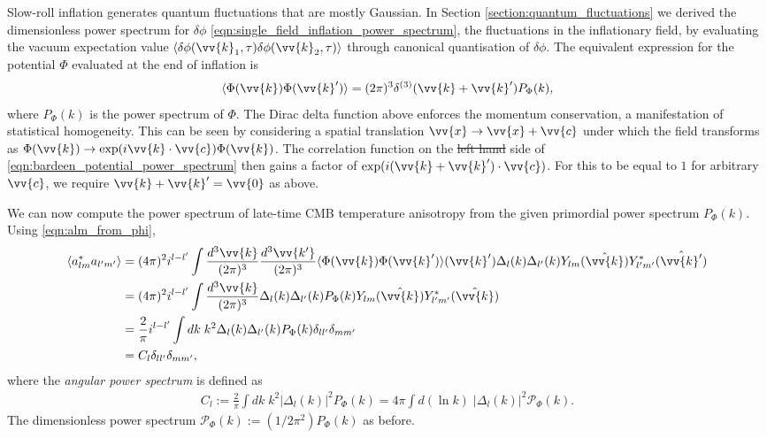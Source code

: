 \documentclass[a4paper,12pt,times,custombib,print,index]{Classes/PhDThesisPSnPDF} %
\providecommand{\DIFadd}[1]{{\protect\color{blue}\uwave{#1}}} %
\providecommand{\DIFdel}[1]{{\protect\color{red}\sout{#1}}}                      %
\providecommand{\DIFaddbegin}{} %
\providecommand{\DIFaddend}{} %
\providecommand{\DIFdelbegin}{} %
\providecommand{\DIFdelend}{} %
\newcommand{\DIFscaledelfig}{0.5}
\newlength{\DIFdelgraphicswidth} %
\newlength{\DIFdelgraphicsheight} %
\newcommand{\DIFaddincludegraphics}[2][]{{\color{blue}\fbox{\DIFOincludegraphics[#1]{#2}}}} %
\newcommand{\DIFdelincludegraphics}[2][]{%
\sbox{\DIFdelgraphicsbox}{\DIFOincludegraphics[#1]{#2}}%
\settoboxwidth{\DIFdelgraphicswidth}{\DIFdelgraphicsbox} %
\settoboxtotalheight{\DIFdelgraphicsheight}{\DIFdelgraphicsbox} %
\scalebox{\DIFscaledelfig}{%
\parbox[b]{\DIFdelgraphicswidth}{\usebox{\DIFdelgraphicsbox}\\[-\baselineskip] \rule{\DIFdelgraphicswidth}{0em}}\llap{\resizebox{\DIFdelgraphicswidth}{\DIFdelgraphicsheight}{%
\setlength{\unitlength}{\DIFdelgraphicswidth}%
\begin{picture}(1,1)%
\thicklines\linethickness{2pt} %
{\color[rgb]{1,0,0}\put(0,0){\framebox(1,1){}}}%
{\color[rgb]{1,0,0}\put(0,0){\line( 1,1){1}}}%
{\color[rgb]{1,0,0}\put(0,1){\line(1,-1){1}}}%
\end{picture}%
}\hspace*{3pt}}} %
} %
\DeclareRobustCommand{\DIFaddbegin}{\DIFOaddbegin \let\includegraphics\DIFaddincludegraphics} %
\DeclareRobustCommand{\DIFaddend}{\DIFOaddend \let\includegraphics\DIFOincludegraphics} %
\DeclareRobustCommand{\DIFdelbegin}{\DIFOdelbegin \let\includegraphics\DIFdelincludegraphics} %
\DeclareRobustCommand{\DIFdelend}{\DIFOaddend \let\includegraphics\DIFOincludegraphics} %
\begin{document}
Slow-roll inflation generates quantum fluctuations that are mostly Gaussian. In Section \ref{section:quantum_fluctuations} we derived the dimensionless power spectrum for $\delta\phi$ \eqref{eqn:single_field_inflation_power_spectrum}, the fluctuations in the inflationary field, by evaluating the vacuum expectation value $\langle \delta\phi(\vv{k}_1,\tau) \delta\phi(\vv{k}_2,\tau) \rangle$ through canonical quantisation of $\delta\phi$. The equivalent expression for the potential $\Phi$ evaluated at the end of inflation is
\begin{align}
	\langle \Phi (\vv{k}) \Phi (\vv{k}') \rangle = (2\pi)^3 \delta^{(3)} (\vv{k} + \vv{k}') P_\Phi (k), \label{eqn:bardeen_potential_power_spectrum}
\end{align}
where $P_\Phi (k)$ is the power spectrum of $\Phi$. The Dirac delta function above enforces the momentum conservation, a manifestation of statistical homogeneity. This can be seen by considering a spatial translation $\vv{x} \rightarrow \vv{x}+\vv{c}$ under which the field transforms as $\Phi(\vv{k}) \rightarrow \exp(i\vv{k}\cdot\vv{c}) \Phi(\vv{k})$. The correlation function on the \DIFdelbegin \DIFdel{left hand }\DIFdelend \DIFaddbegin \DIFadd{left-hand }\DIFaddend side of \eqref{eqn:bardeen_potential_power_spectrum} then gains a factor of $\exp(i(\vv{k}+\vv{k}')\cdot\vv{c})$. For this to be equal to $1$ for arbitrary $\vv{c}$, we require $\vv{k}+\vv{k}'=\vv{0}$ as above.

We can now compute the power spectrum of late-time CMB temperature anisotropy from the given primordial power spectrum $P_\Phi(k)$. Using \eqref{eqn:alm_from_phi},
\begin{align}
	\langle a^*_{lm} a_{l'm'} \rangle &= (4\pi)^2 i^{l-l'} \int \frac{d^3\vv{k}}{(2\pi)^3} \frac{d^3\vv{k'}}{(2\pi)^3} \langle \Phi (\vv{k}) \Phi (\vv{k}') \rangle (\vv{k}') \Delta_l (k) \Delta_{l'} (k) Y_{lm}(\hat{\vv{k}}) Y^*_{l'm'}(\hat{\vv{k}'})  \\
	&= (4\pi)^2 i^{l-l'} \int \frac{d^3\vv{k}}{(2\pi)^3} \Delta_l (k) \Delta_{l'} (k) P_\Phi(k) Y_{lm}(\hat{\vv{k}}) Y^*_{l'm'}(\hat{\vv{k}}) \\
	&= \frac{2}{\pi} i^{l-l'} \int dk \; k^2  \Delta_l (k) \Delta_{l'} (k) P_\Phi (k) \delta_{ll'} \delta_{mm'} \\
	&= C_{l} \delta_{ll'} \delta_{mm'}, \label{eqn:angular_power_spectrum_form}
\end{align}
where the \textit{angular power spectrum} is defined as
\begin{align}
		C_l := \frac{2}{\pi} \int dk \; k^2 |\Delta_l(k)|^2 P_\Phi (k) = 4\pi \int d(\ln k) \; |\Delta_l(k)|^2 \mathcal{P}_\Phi (k).
\end{align}
The dimensionless power spectrum $\mathcal{P}_\Phi(k) := (1/2\pi^2) P_\Phi(k)$ as before.
\end{document}
